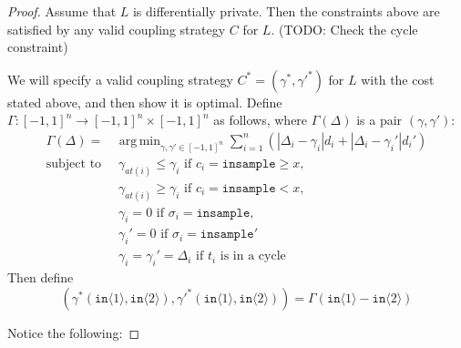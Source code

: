 \documentclass[12pt]{article}
\newcommand{\gguard}[1][x]{\texttt{insample}\geq #1}
\newcommand{\lguard}[1][x]{\texttt{insample} < #1}
\newcommand{\brangle}[1]{\langle #1 \rangle}
\DeclareMathOperator*{\argmin}{arg\,min}
\theoremstyle{definition}
\begin{document}
\begin{proof}
    Assume that $L$ is differentially private. Then the constraints above are satisfied by any valid coupling strategy $C$ for $L$. (TODO: Check the cycle constraint)

    We will specify a valid coupling strategy $C^* = (\gamma^*, {\gamma'}^*)$ for $L$ with the cost stated above, and then show it is optimal. Define $\Gamma: [-1, 1]^n \to [-1, 1]^n \times [-1, 1]^n$ as follows, where $\Gamma(\Delta)$ is a pair $(\gamma, \gamma')$: 
    \begin{align*}
        \Gamma(\Delta) = &\argmin_{\gamma, \gamma' \in [-1, 1]^n} \sum_{i = 1}^n \left(|\Delta_i - \gamma_i| d_i + |\Delta_i - \gamma_i'|d_i' \right)\\ 
        \text{subject to }
        &\ \gamma_{at(i)} \leq \gamma_i \text{ if } c_i = \gguard, \\
        &\ \gamma_{at(i)} \geq \gamma_i \text{ if } c_i = \lguard, \\
        &\ \gamma_i = 0 \text{ if } \sigma_i = \texttt{insample}, \\
        &\ \gamma_i' = 0 \text{ if } \sigma_i = \texttt{insample}'\\
        &\ \gamma_i = \gamma_i'= \Delta_i \text{ if } t_i \text{ is in a cycle}
    \end{align*}
    Then define \[(\gamma^*(\texttt{in}\brangle{1}, \texttt{in}\brangle{2}), {\gamma'}^*(\texttt{in}\brangle{1}, \texttt{in}\brangle{2})) = \Gamma(\texttt{in}\brangle{1} - \texttt{in}\brangle{2})\]

    Notice the following: 


\end{proof}
\end{document}
